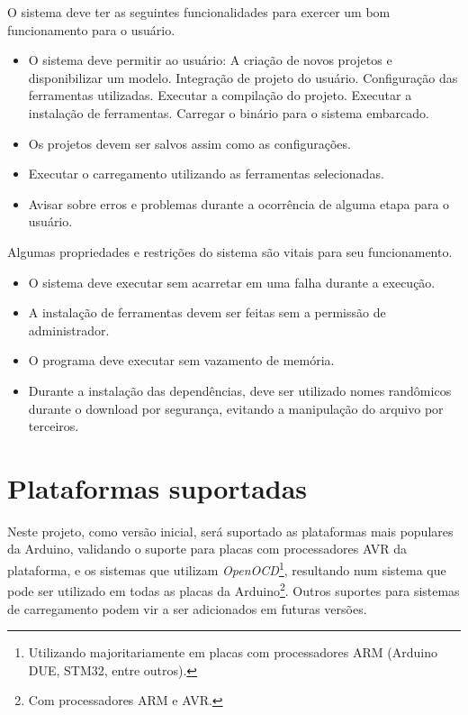 O sistema deve ter as seguintes funcionalidades para exercer um bom funcionamento para o usuário.
\begin{itemize}
\item O sistema deve permitir ao usuário:
	\subitem A criação de novos projetos e disponibilizar um modelo.
	\subitem Integração de projeto do usuário.
    \subitem Configuração das ferramentas utilizadas.
	\subitem Executar a compilação do projeto.
	\subitem Executar a instalação de ferramentas.
	\subitem Carregar o binário para o sistema embarcado.
\item Os projetos devem ser salvos assim como as configurações.
\item Executar o carregamento utilizando as ferramentas selecionadas.
\item Avisar sobre erros e problemas durante a ocorrência de alguma etapa para o usuário.	
\end{itemize}

Algumas propriedades e restrições do sistema são vitais para seu funcionamento.
\begin{itemize}
\item O sistema deve executar sem acarretar em uma falha durante a execução.
\item A instalação de ferramentas devem ser feitas sem a permissão de administrador.
\item O programa deve executar sem vazamento de memória.
\item Durante a instalação das dependências, deve ser utilizado nomes randômicos durante o download por segurança, evitando a manipulação do arquivo por terceiros.
\end{itemize}

\section{Plataformas suportadas}

Neste projeto, como versão inicial, será suportado as plataformas mais populares da Arduino, validando o suporte para placas com processadores AVR da plataforma, e os sistemas que utilizam \textit{OpenOCD}\footnote{Utilizando majoritariamente em placas com processadores ARM (Arduino DUE, STM32, entre outros).}, resultando num sistema que pode ser utilizado em todas as placas da Arduino\footnote{Com processadores ARM e AVR.}. Outros suportes para sistemas de carregamento podem vir a ser adicionados em futuras versões.


